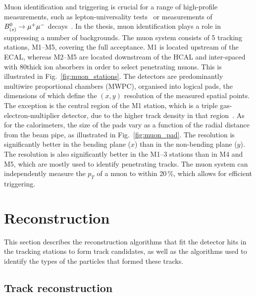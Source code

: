Muon identification and triggering is crucial for a range of high-profile \lhcb measurements, such as lepton-universality tests~\cite{LHCB-PAPER-2019-009,PAPER-2020-002} or measurements of  $B^0_{(s)}\rightarrow{\ensuremath{\mu^+}} \mu^-$ decays~\cite{PAPER-2017-001}. In the thesis, muon identification plays a role in suppressing a number of backgrounds. The \lhcb muon system consists of 5 tracking stations, M1--M5, covering the full \lhcb acceptance. M1 is located upstream of the ECAL, whereas M2--M5 are located downstream of the HCAL and inter-spaced with 80\cm thick ion absorbers in order to select penetrating muons. This is illustrated in Fig.~\ref{fig:muon_stations}. The detectors are predominantly multiwire proportional chambers (MWPC), organised into logical pads, the dimensions of which define the $(x, y)$ resolution of the measured spatial points. The exception is the central region of the M1 station, which is a triple gas-electron-multiplier detector, due to the higher track density in that region~\cite{LHCb-TDR-5-add-2}. As for the calorimeters, the size of the pads vary as a function of the radial distance from the beam pipe, as illustrated in Fig.~\ref{fig:muon_pad}. The resolution is significantly better in the bending plane ($x$) than in the non-bending plane ($y$). The resolution is also significantly better in the M1--3 stations than in M4 and M5, which are mostly used to identify penetrating tracks. The muon system can independently measure the $p_T$ of a muon to within 20\,\%, which allows for efficient triggering.



\section{Reconstruction} %
\label{sec:reconstruction}

This section describes the reconstruction algorithms that fit the detector hits in the tracking stations to form track candidates, as well as the algorithms used to identify the types of the particles that formed these tracks.


\subsection{Track reconstruction} %
\label{sub:track_reconstruction}

